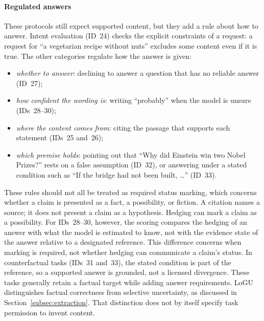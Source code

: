 \documentclass{clv2025}
\begin{document}
\paragraph{Regulated answers}
These protocols still expect supported content, but they add a rule about
how to answer. Intent evaluation (ID~24) checks the explicit constraints of
a request: a request for ``a vegetarian recipe without nuts'' excludes some
content even if it is true. The other categories regulate how the answer
is given:
\begin{itemize}
\item \emph{whether to answer}: declining to answer a question that has no
reliable answer (ID~27);
\item \emph{how confident the wording is}: writing ``probably'' when the
model is unsure (IDs~28--30);
\item \emph{where the content comes from}: citing the passage that supports
each statement (IDs~25 and~26);
\item \emph{which premise holds}: pointing out that ``Why did Einstein win
two Nobel Prizes?'' rests on a false assumption (ID~32), or answering under
a stated condition such as ``If the bridge had not been built, \ldots''
(ID~33).
\end{itemize}
These rules should not all be treated as required status marking, which
concerns whether a claim is presented as a fact, a possibility, or fiction.
A citation names a source; it does not present a claim as a hypothesis.
Hedging can mark a claim as a possibility. For IDs~28--30, however, the
scoring compares the hedging of an answer with what the model is estimated
to know, not with the evidence state of the answer relative to a
designated reference. This difference concerns when marking
is required, not whether hedging can communicate a claim's status. In
counterfactual tasks (IDs~31 and~33), the stated condition is part of the reference, so a
supported answer is grounded, not a licensed divergence. These tasks generally retain a factual target while adding answer
requirements. LoGU \citep{yang_logu_2025} distinguishes factual correctness from selective
uncertainty, as discussed in Section~\ref{subsec:extraction}. That distinction
does not by itself specify task permission to invent content.
\end{document}
